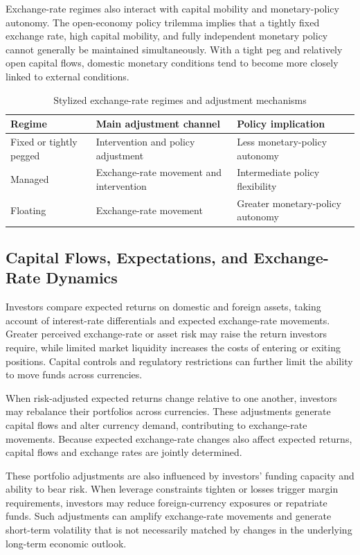 Exchange-rate regimes also interact with capital mobility and monetary-policy autonomy. The open-economy policy trilemma implies that a tightly fixed exchange rate, high capital mobility, and fully independent monetary policy cannot generally be maintained simultaneously. With a tight peg and relatively open capital flows, domestic monetary conditions tend to become more closely linked to external conditions.

\begin{table}[H]
\centering
\caption{Stylized exchange-rate regimes and adjustment mechanisms}
\label{tab:ch10-exchange-rate-regimes}
\begin{tabularx}{\textwidth}{@{}p{2.7cm}X X@{}}
\toprule
\textbf{Regime}
& \textbf{Main adjustment channel}
& \textbf{Policy implication} \\
\midrule
Fixed or tightly pegged
& Intervention and policy adjustment
& Less monetary-policy autonomy \\
Managed
& Exchange-rate movement and intervention
& Intermediate policy flexibility \\
Floating
& Exchange-rate movement
& Greater monetary-policy autonomy \\
\bottomrule
\end{tabularx}
\end{table}

\subsection{Capital Flows, Expectations, and Exchange-Rate Dynamics}

Investors compare expected returns on domestic and
foreign assets, taking account of interest-rate
differentials and expected exchange-rate movements.
Greater perceived exchange-rate or asset risk may
raise the return investors require, while limited
market liquidity increases the costs of entering
or exiting positions. Capital controls and regulatory
restrictions can further limit the ability to move
funds across currencies.

When risk-adjusted expected returns change relative
to one another, investors may rebalance their
portfolios across currencies. These adjustments
generate capital flows and alter currency demand,
contributing to exchange-rate movements. Because
expected exchange-rate changes also affect expected
returns, capital flows and exchange rates are
jointly determined.

These portfolio adjustments are also influenced
by investors' funding capacity and ability to bear
risk. When leverage constraints tighten or losses
trigger margin requirements, investors may reduce
foreign-currency exposures or repatriate funds. Such adjustments can amplify exchange-rate movements
and generate short-term volatility that is not
necessarily matched by changes in the underlying
long-term economic outlook.

